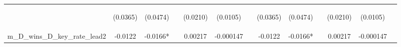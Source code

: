 \documentclass[]{article}
\begin{document}
\begin{center}
\begin{tabular}{lcccccccccccc}
\vspace{4pt} & \begin{footnotesize}(0.0365)\end{footnotesize} & \begin{footnotesize}(0.0474)\end{footnotesize} & \begin{footnotesize}\end{footnotesize} & \begin{footnotesize}(0.0210)\end{footnotesize} & \begin{footnotesize}(0.0105)\end{footnotesize} & \begin{footnotesize}\end{footnotesize} & \begin{footnotesize}(0.0365)\end{footnotesize} & \begin{footnotesize}(0.0474)\end{footnotesize} & \begin{footnotesize}\end{footnotesize} & \begin{footnotesize}(0.0210)\end{footnotesize} & \begin{footnotesize}(0.0105)\end{footnotesize} & \begin{footnotesize}\end{footnotesize} \\
m\_D\_wins\_D\_key\_rate\_lead2 & -0.0122 & -0.0166* &  & 0.00217 & -0.000147 &  & -0.0122 & -0.0166* &  & 0.00217 & -0.000147 &  \\

\end{tabular}
\end{center}
\end{document}
